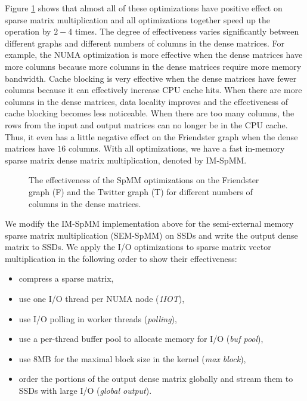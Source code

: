 Figure \ref{perf:spmm_opt} shows that almost all of these optimizations have
positive effect on sparse matrix multiplication and all optimizations
together speed up the operation by $2-4$ times.
The degree of effectiveness varies
significantly between different graphs and different numbers of columns in
the dense matrices. For example, the NUMA optimization is more effective when
the dense matrices have more columns because more columns in the dense matrices
require more memory bandwidth. Cache blocking is very effective when
the dense matrices have fewer columns because it can effectively increase CPU
cache hits. When there are more columns in the dense matrices, data locality
improves and the effectiveness of cache blocking becomes less noticeable.
When there are too many columns, the rows from
the input and output matrices can no longer be in the CPU cache. Thus, it even
has a little negative effect on the Friendster graph when the dense matrices
have $16$ columns. With all optimizations, we have a fast in-memory sparse
matrix dense matrix multiplication, denoted by IM-SpMM.


\begin{figure}
	\begin{center}
		\footnotesize
		
		\caption{The effectiveness of the SpMM optimizations on the Friendster
			graph (F) and the Twitter graph (T) for different numbers of
			columns in the dense matrices.}
		\label{perf:spmm_opt}
	\end{center}
\end{figure}

We modify the IM-SpMM implementation above for the semi-external memory sparse
matrix multiplication (SEM-SpMM) on SSDs and write the output dense matrix to
SSDs. We apply the I/O optimizations to sparse matrix vector multiplication
in the following order to show their effectiveness:
\begin{itemize} \itemsep1pt \parskip0pt 
	\item compress a sparse matrix,
	\item use one I/O thread per NUMA node (\textit{1IOT}),
	\item use I/O polling in worker threads (\textit{polling}),
	\item use a per-thread buffer pool to allocate memory for I/O
		(\textit{buf pool}),
	\item use 8MB for the maximal block size in the kernel (\textit{max block}),
	\item order the portions of the output dense matrix globally and stream them
		to SSDs with large I/O (\textit{global output}).
\end{itemize}

